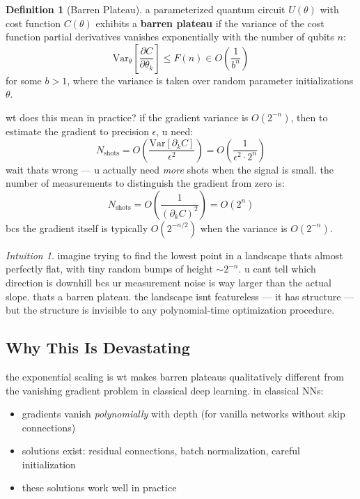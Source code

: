 \documentclass[11pt,a4paper]{article}
\theoremstyle{definition}
\newtheorem{definition}{Definition}[section]
\theoremstyle{remark}
\newtheorem*{intuition}{Intuition}
\begin{document}
\begin{definition}[Barren Plateau]
a parameterized quantum circuit $U(\theta)$ with cost function $C(\theta)$ exhibits a \textbf{barren plateau} if the variance of the cost function partial derivatives vanishes exponentially with the number of qubits $n$:
\begin{equation}
    \text{Var}_\theta\left[\frac{\partial C}{\partial \theta_k}\right] \leq F(n) \in O\left(\frac{1}{b^n}\right)
\end{equation}
for some $b > 1$, where the variance is taken over random parameter initializations $\theta$.
\end{definition}

wt does this mean in practice? if the gradient variance is $O(2^{-n})$, then to estimate the gradient to precision $\epsilon$, u need:
\begin{equation}
    N_{\text{shots}} = O\left(\frac{\text{Var}[\partial_k C]}{\epsilon^2}\right) = O\left(\frac{1}{\epsilon^2 \cdot 2^n}\right)
\end{equation}
wait thats wrong --- u actually need \emph{more} shots when the signal is small. the number of measurements to distinguish the gradient from zero is:
\begin{equation}
    N_{\text{shots}} = O\left(\frac{1}{(\partial_k C)^2}\right) = O(2^n)
\end{equation}
bcs the gradient itself is typically $O(2^{-n/2})$ when the variance is $O(2^{-n})$.

\begin{intuition}
imagine trying to find the lowest point in a landscape thats almost perfectly flat, with tiny random bumps of height $\sim 2^{-n}$. u cant tell which direction is downhill bcs ur measurement noise is way larger than the actual slope. thats a barren plateau. the landscape isnt featureless --- it has structure --- but the structure is invisible to any polynomial-time optimization procedure.
\end{intuition}

\subsection{Why This Is Devastating}

the exponential scaling is wt makes barren plateaus qualitatively different from the vanishing gradient problem in classical deep learning. in classical NNs:
\begin{itemize}
    \item gradients vanish \emph{polynomially} with depth (for vanilla networks without skip connections)
    \item solutions exist: residual connections, batch normalization, careful initialization
    \item these solutions work well in practice
\end{itemize}
\end{document}
